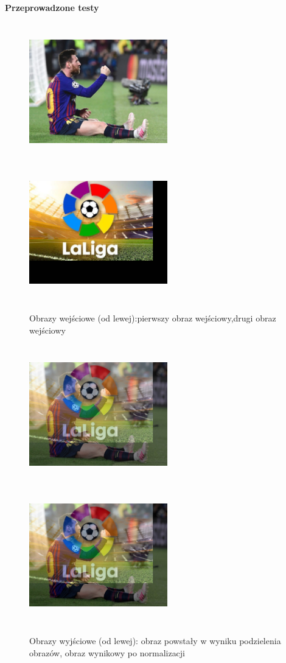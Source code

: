 \documentclass[magisterska,openany]{pracadypl}
\begin{document}
\newpage
\vspace{0.25cm}\textbf{\Large Przeprowadzone testy}
\vspace{0.5cm}
\begin{figure}[h]
\centering
\includegraphics[width=6cm, height=6cm]{2_4/ResolRGB1.jpg}
\includegraphics[width=6cm, height=6cm]{2_4/ResolRGB2.jpg}
\caption{Obrazy wejściowe (od lewej):pierwszy obraz wejściowy,drugi obraz wejściowy}
\end{figure}
\begin{figure}[h]
\centering
\includegraphics[width=6cm, height=6cm]{4_8/divtwoRGB1.jpg}
\includegraphics[width=6cm, height=6cm]{4_8/ndivtwoRGB1.jpg}
\caption{Obrazy wyjściowe (od lewej): obraz powstały w wyniku
podzielenia obrazów, obraz wynikowy po normalizacji}
\end{figure}
\end{document}
